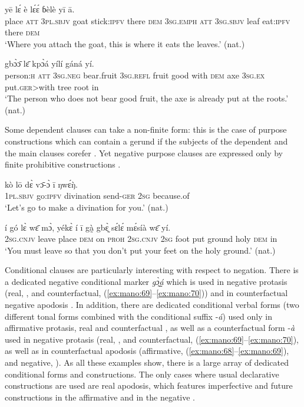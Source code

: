 \documentclass[output=paper,colorlinks,citecolor=brown]{langscibook}
\begin{document}
\ea\label{ex:mano:61}
    \gll [lɛ̀ lɛ́ ò ɓò kɔ̀nɔ̀ yī  ā] yē lɛ́ è lɛ́ɛ́ ɓèlè yī ā. \\
         place  \textsc{att} \textsc{3pl.sbjv} goat stick\textsc{:ipfv} there  \textsc{dem} \textsc{3sg.emph}  \textsc{att} \textsc{3sg.sbjv} leaf eat:\textsc{ipfv} there \textsc{dem} \\
    \glt ‘Where you attach the goat, this is where it eats the leaves.’ (nat.)
\z

\ea\label{ex:mano:62}
    \gll [mí nɛ́ lɛ̀ɛ́ ɓā ē ɓɛ̄ɛ̄ yīè ká ā] gbɔ̀ɔ̄ lɛ̄ kpɔ̀á yílí gáná yí.   \\
         person:\textsc{h}  \textsc{att} \textsc{3sg.neg} bear.fruit \textsc{3sg.refl} fruit good with \textsc{dem} axe \textsc{3sg.ex} put.\textsc{ger>}with tree root in  \\
    \glt ‘The person who does not bear good fruit, the axe is already put at the roots.’ (nat.)
\z

Some dependent clauses can take a non-finite form: this is the case of purpose constructions which can contain a gerund if the subjects of the dependent and the main clauses corefer . Yet negative purpose clauses are expressed only by finite prohibitive constructions .

\ea\label{ex:mano:63}
    \gll kò lō dɛ̀ vɔ̄-ɔ̀ ī ŋwɛ́ŋ̀.  \\
         \textsc{1pl.sbjv} go:\textsc{ipfv} divination send-\textsc{ger} \textsc{2sg} because.of  \\
    \glt ‘Let’s go to make a divination for you.’ (nat.)
\z

\ea\label{ex:mano:64}
    \gll í gó lɛ̀ wɛ̄ mɔ̀, yékɛ̀ í ī gà̰ gbɛ̰̀ sɛ́lɛ́ mɛ́síà wɛ̄ yí. \\
         \textsc{2sg.cnjv} leave place \textsc{dem} on \textsc{proh} \textsc{2sg.cnjv} \textsc{2sg} foot put ground holy \textsc{dem} in \\
    \glt ‘You must leave so that you don’t put your feet on the holy ground.’ (nat.)
\z

Conditional clauses are particularly interesting with respect to negation. There is a dedicated negative conditional marker \textit{gɔ̰̀á̰̰} which is used in negative protasis (real, , and counterfactual, (\ref{ex:mano:69}--\ref{ex:mano:70})) and in counterfactual negative apodosis . In addition, there are dedicated conditional verbal forms (two different tonal forms combined with the conditional suffix -\textit{á}) used only in affirmative protasis, real  and counterfactual , as well as a counterfactual form -\textit{à} used in negative protasis (real, , and counterfactual, (\ref{ex:mano:69}--\ref{ex:mano:70}), as well as in counterfactual apodosis (affirmative, (\ref{ex:mano:68}--\ref{ex:mano:69}), and negative, ).
As all these examples show, there is a large array of dedicated conditional forms and constructions. The only cases where usual declarative constructions are used are real apodosis, which features imperfective and future constructions in the affirmative  and in the negative .
\end{document}
